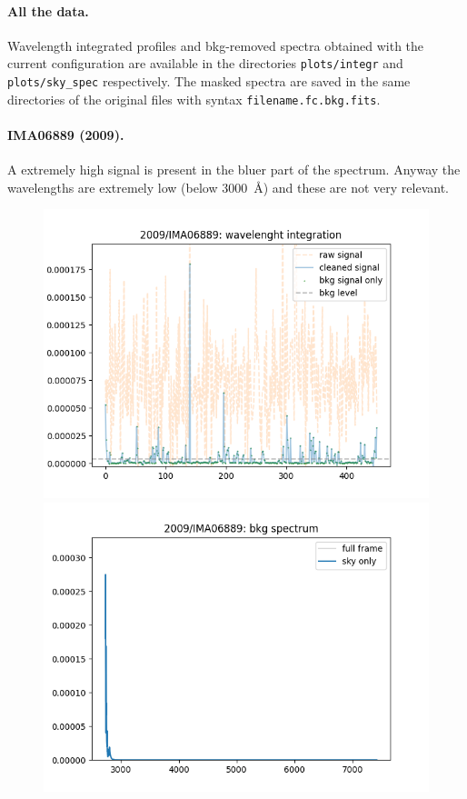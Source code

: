 \documentclass{article}
\begin{document}
\paragraph{All the data.} Wavelength integrated profiles and bkg-removed spectra obtained with the current configuration are available in the directories \texttt{plots/integr} and \texttt{plots/sky\_spec} respectively. The masked spectra are saved in the same directories of the original files with syntax \texttt{filename.fc.bkg.fits}.

\paragraph{IMA06889 (2009).} A extremely high signal is present in the bluer part of the spectrum. Anyway the wavelengths are extremely low (below \SI{3000}{\angstrom}) and these are not very relevant.
\begin{figure}[h!]
	\begin{minipage}{.49\textwidth}
		\centering
		\includegraphics[width=\textwidth]{2009_IMA06889}
	\end{minipage}
\hfill
	\begin{minipage}{.49\textwidth}
	\centering
	\includegraphics[width=\textwidth]{IMA06889}
\end{minipage}
\end{figure}
\end{document}
